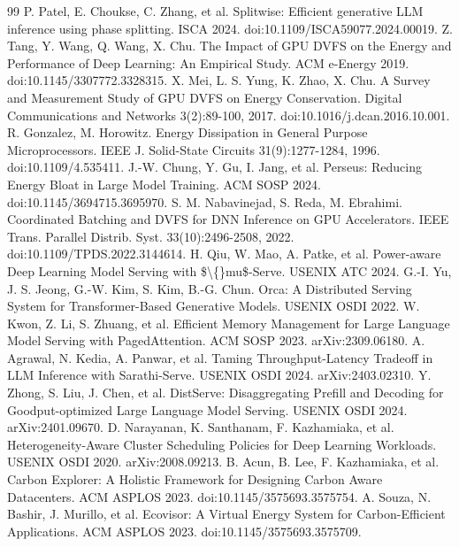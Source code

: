 \documentclass[3p,twocolumn]{elsarticle}
\begin{document}
\begin{thebibliography}{99}
\label{r16} P. Patel, E. Choukse, C. Zhang, et al. Splitwise: Efficient generative LLM inference using phase splitting. ISCA 2024. doi:10.1109/ISCA59077.2024.00019.
\label{r17} Z. Tang, Y. Wang, Q. Wang, X. Chu. The Impact of GPU DVFS on the Energy and Performance of Deep Learning:
An Empirical Study. ACM e-Energy 2019. doi:10.1145/3307772.3328315.
\label{r18} X. Mei, L. S. Yung, K. Zhao, X. Chu. A Survey and Measurement Study of GPU DVFS on Energy Conservation.
Digital Communications and Networks 3(2):89-100, 2017. doi:10.1016/j.dcan.2016.10.001.
\label{r19} R. Gonzalez, M. Horowitz. Energy Dissipation in General Purpose Microprocessors. IEEE J. Solid-State
Circuits 31(9):1277-1284, 1996. doi:10.1109/4.535411.
\label{r20} J.-W. Chung, Y. Gu, I. Jang, et al. Perseus: Reducing Energy Bloat in Large Model Training. ACM SOSP 2024.
doi:10.1145/3694715.3695970.
\label{r21} S. M. Nabavinejad, S. Reda, M. Ebrahimi. Coordinated Batching and DVFS for DNN Inference on GPU
Accelerators. IEEE Trans. Parallel Distrib. Syst. 33(10):2496-2508, 2022. doi:10.1109/TPDS.2022.3144614.
\label{r22} H. Qiu, W. Mao, A. Patke, et al. Power-aware Deep Learning Model Serving with \$\textbackslash\{\}mu\$-Serve. USENIX ATC 2024.
\label{r23} G.-I. Yu, J. S. Jeong, G.-W. Kim, S. Kim, B.-G. Chun. Orca: A Distributed Serving System for
Transformer-Based Generative Models. USENIX OSDI 2022.
\label{r24} W. Kwon, Z. Li, S. Zhuang, et al. Efficient Memory Management for Large Language Model Serving with
PagedAttention. ACM SOSP 2023. arXiv:2309.06180.
\label{r25} A. Agrawal, N. Kedia, A. Panwar, et al. Taming Throughput-Latency Tradeoff in LLM Inference with
Sarathi-Serve. USENIX OSDI 2024. arXiv:2403.02310.
\label{r26} Y. Zhong, S. Liu, J. Chen, et al. DistServe: Disaggregating Prefill and Decoding for Goodput-optimized
Large Language Model Serving. USENIX OSDI 2024. arXiv:2401.09670.
\label{r27} D. Narayanan, K. Santhanam, F. Kazhamiaka, et al. Heterogeneity-Aware Cluster Scheduling Policies for Deep
Learning Workloads. USENIX OSDI 2020. arXiv:2008.09213.
\label{r28} B. Acun, B. Lee, F. Kazhamiaka, et al. Carbon Explorer: A Holistic Framework for Designing Carbon Aware
Datacenters. ACM ASPLOS 2023. doi:10.1145/3575693.3575754.
\label{r29} A. Souza, N. Bashir, J. Murillo, et al. Ecovisor: A Virtual Energy System for Carbon-Efficient
Applications. ACM ASPLOS 2023. doi:10.1145/3575693.3575709.

\end{thebibliography}
\end{document}
